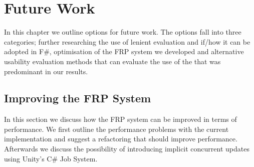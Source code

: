 \chapter{Future Work}
In this chapter we outline options for future work. The options fall into three categories; further researching the use of lenient evaluation and if/how it can be adopted in F\#, optimisation of the \gls{FRP} system we developed and alternative usability evaluation methods that can evaluate the use of the  that was predominant in our results.


\section{Improving the FRP System}
In this section we discuss how the \gls{FRP} system can be improved in terms of performance. We first outline the performance problems with the current implementation and suggest a refactoring that should improve performance. Afterwards we discuss the possibility of introducing implicit concurrent updates using Unity's C\# Job System.




